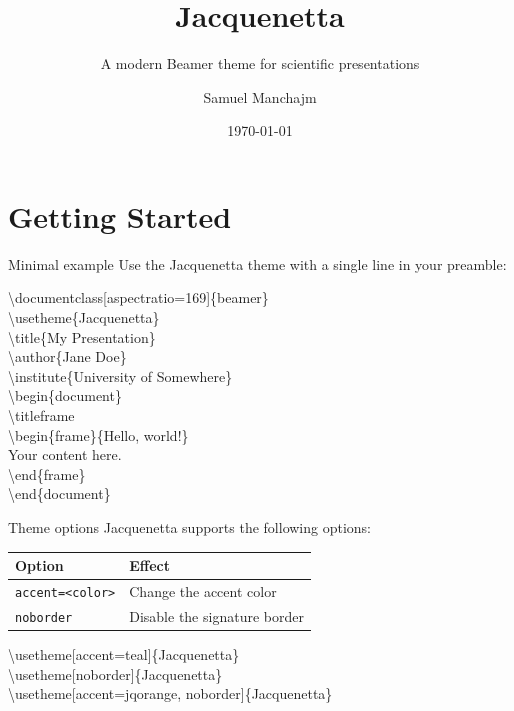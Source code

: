 \documentclass[aspectratio=169]{beamer}
\title{Jacquenetta}
\subtitle{A modern Beamer theme for scientific presentations}
\author{Samuel Manchajm}
\institute{GitHub --- Jacquenetta-beamer-theme}
\date{\today}
\begin{document}
\titleframe
\logo{}  %

\section{Getting Started}

\begin{frame}{Minimal example}
    Use the Jacquenetta theme with a single line in your preamble:

    \vspace{0.1cm}
    {\small\ttfamily
    \textbackslash documentclass[aspectratio=169]\{beamer\}\\
    \textbackslash usetheme\{Jacquenetta\}\\[2pt]
    \textbackslash title\{My Presentation\}\\
    \textbackslash author\{Jane Doe\}\\
    \textbackslash institute\{University of Somewhere\}\\[2pt]
    \textbackslash begin\{document\}\\
    \quad\textbackslash titleframe\\
    \quad\textbackslash begin\{frame\}\{Hello, world!\}\\
    \quad\quad Your content here.\\
    \quad\textbackslash end\{frame\}\\
    \textbackslash end\{document\}
    }
\end{frame}

\begin{frame}{Theme options}
    Jacquenetta supports the following options:

    \vspace{0.3cm}
    \begin{tabular}{ll}
        \toprule
        \textbf{Option} & \textbf{Effect} \\
        \midrule
        \texttt{accent=<color>} & Change the accent color \\
        \texttt{noborder}       & Disable the signature border \\
        \bottomrule
    \end{tabular}

    \vspace{0.5cm}
    {\small\ttfamily
    \textbackslash usetheme[accent=teal]\{Jacquenetta\}\\
    \textbackslash usetheme[noborder]\{Jacquenetta\}\\
    \textbackslash usetheme[accent=jqorange, noborder]\{Jacquenetta\}
    }
\end{frame}
\end{document}
